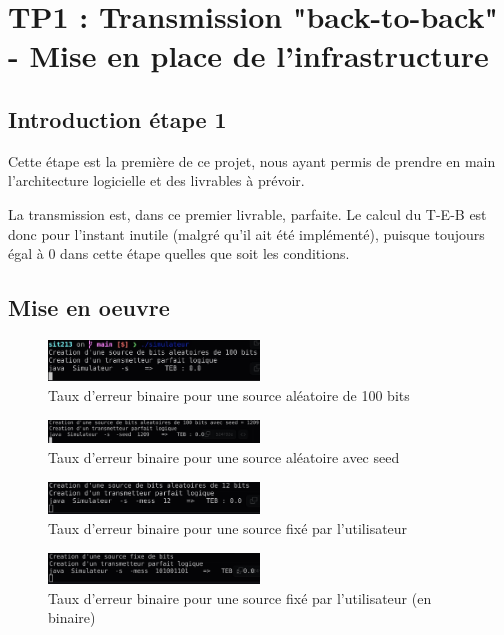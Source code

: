 \section{TP1 : Transmission "back-to-back" - Mise en place de l'infrastructure}

\subsection{Introduction étape 1}


Cette étape est la première de ce projet, nous ayant permis de prendre en main l'architecture logicielle et des livrables à prévoir.

La transmission est, dans ce premier livrable, parfaite. Le calcul du T-E-B est donc pour l'instant inutile (malgré qu'il ait été implémenté), puisque toujours égal à 0 dans cette étape quelles que soit les conditions.

\subsection{Mise en oeuvre}


\begin{figure}[H]
    \centering
    \includegraphics[width=0.5\textwidth]{img/etape1_teb1.jpg}
    \caption{Taux d'erreur binaire pour une source aléatoire de 100 bits}
    \label{fig:teb1}
\end{figure}
\begin{figure}[H]
    \centering
    \includegraphics[width=0.5\textwidth]{img/etape1_teb3.jpg}
    \caption{Taux d'erreur binaire pour une source aléatoire avec seed}
    \label{fig:teb2}
\end{figure}
\begin{figure}[H]
    \centering
    \includegraphics[width=0.5\textwidth]{img/etape1_teb2.jpg}
    \caption{Taux d'erreur binaire pour une source fixé par l'utilisateur}
    \label{fig:teb3}
\end{figure}
\begin{figure}[H]
    \centering
    \includegraphics[width=0.5\textwidth]{img/etape1_teb4.jpg}
    \caption{Taux d'erreur binaire pour une source fixé par l'utilisateur (en binaire)}
    \label{fig:teb4}
\end{figure}


